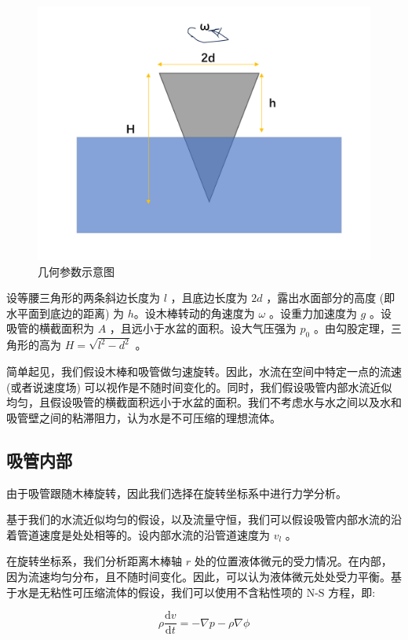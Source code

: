 \documentclass[fontset=windows]{article}
\begin{document}
\begin{figure}[htbp]
    \centering
    \includegraphics[scale=0.5]{8.png}
    \caption{几何参数示意图}
    \label{2}
\end{figure}

设等腰三角形的两条斜边长度为 $l$ ，且底边长度为 $2d$ ，露出水面部分的高度 (即水平面到底边的距离) 为 $h$。设木棒转动的角速度为 $\omega$ 。设重力加速度为 $g$ 。设吸管的横截面积为 $A$ ，且远小于水盆的面积。设大气压强为 $p_0$ 。由勾股定理，三角形的高为 $H = \sqrt{l ^ 2 - d ^ 2}$ 。

简单起见，我们假设木棒和吸管做匀速旋转。因此，水流在空间中特定一点的流速 (或者说速度场) 可以视作是不随时间变化的。同时，我们假设吸管内部水流近似均匀，且假设吸管的横截面积远小于水盆的面积。我们不考虑水与水之间以及水和吸管壁之间的粘滞阻力，认为水是不可压缩的理想流体。

\subsection{吸管内部}

由于吸管跟随木棒旋转，因此我们选择在旋转坐标系中进行力学分析。

基于我们的水流近似均匀的假设，以及流量守恒，我们可以假设吸管内部水流的沿着管道速度是处处相等的。设内部水流的沿管道速度为 $v_l$ 。

在旋转坐标系，我们分析距离木棒轴 $r$ 处的位置液体微元的受力情况。在内部，因为流速均匀分布，且不随时间变化。因此，可以认为液体微元处处受力平衡。基于水是无粘性可压缩流体的假设，我们可以使用不含粘性项的 $\text{N-S}$ 方程，即:

$$
\rho\frac{\text{d}v}{\text{d}t} = - \nabla p - \rho \nabla \phi
$$
\end{document}
